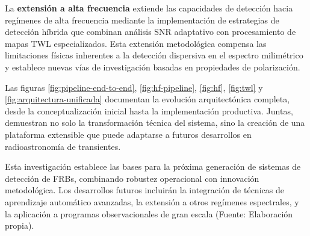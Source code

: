 La \textbf{extensión a alta frecuencia} extiende las capacidades de detección hacia regímenes de alta frecuencia mediante la implementación de estrategias de detección híbrida que combinan análisis SNR adaptativo con procesamiento de mapas TWL especializados. Esta extensión metodológica compensa las limitaciones físicas inherentes a la detección dispersiva en el espectro milimétrico y establece nuevas vías de investigación basadas en propiedades de polarización.

Las figuras \ref{fig:pipeline-end-to-end}, \ref{fig:hf-pipeline}, \ref{fig:hf}, \ref{fig:twl} y \ref{fig:arquitectura-unificada} documentan la evolución arquitectónica completa, desde la conceptualización inicial hasta la implementación productiva. Juntas, demuestran no solo la transformación técnica del sistema, sino la creación de una plataforma extensible que puede adaptarse a futuros desarrollos en radioastronomía de transientes.

Esta investigación establece las bases para la próxima generación de sistemas de detección de FRBs, combinando robustez operacional con innovación metodológica. Los desarrollos futuros incluirán la integración de técnicas de aprendizaje automático avanzadas, la extensión a otros regímenes espectrales, y la aplicación a programas observacionales de gran escala (Fuente: Elaboración propia).